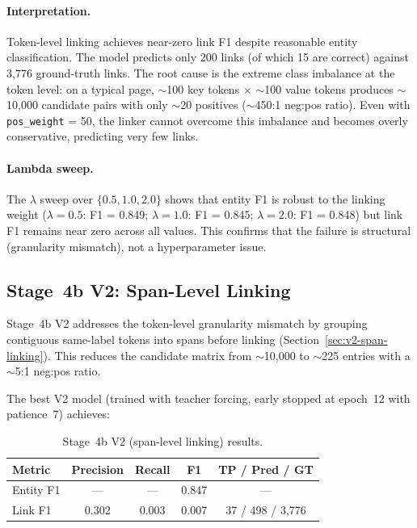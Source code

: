 \paragraph{Interpretation.}
Token-level linking achieves near-zero link F1 despite reasonable entity
classification. The model predicts only 200 links (of which 15 are correct)
against 3{,}776 ground-truth links. The root cause is the extreme class
imbalance at the token level: on a typical page, $\sim$100 key tokens
$\times$ $\sim$100 value tokens produces $\sim$10{,}000 candidate pairs with
only $\sim$20 positives ($\sim$450:1 neg:pos ratio). Even with
\texttt{pos\_weight} = 50, the linker cannot overcome this imbalance and
becomes overly conservative, predicting very few links.

\paragraph{Lambda sweep.}
The $\lambda$ sweep over $\{0.5, 1.0, 2.0\}$ shows that entity F1 is robust
to the linking weight ($\lambda = 0.5$: F1 = 0.849; $\lambda = 1.0$: F1 = 0.845;
$\lambda = 2.0$: F1 = 0.848) but link F1 remains near zero across all
values. This confirms that the failure is structural (granularity mismatch),
not a hyperparameter issue.

\subsection{Stage~4b V2: Span-Level Linking}
\label{sec:v2-results}

Stage~4b V2 addresses the token-level granularity mismatch by grouping
contiguous same-label tokens into spans before linking
(Section~\ref{sec:v2-span-linking}). This reduces the candidate matrix from
$\sim$10{,}000 to $\sim$225 entries with a $\sim$5:1 neg:pos ratio.

The best V2 model (trained with teacher forcing, early stopped at epoch~12
with patience~7) achieves:

\begin{table}[ht]
  \centering
  \caption{Stage~4b V2 (span-level linking) results.}
  \label{tab:v2-results}
  \begin{tabular}{@{}lcccc@{}}
    \toprule
    \textbf{Metric} & \textbf{Precision} & \textbf{Recall} & \textbf{F1} & \textbf{TP / Pred / GT} \\
    \midrule
    Entity F1 & --- & --- & 0.847 & --- \\
    Link F1   & 0.302 & 0.003 & 0.007 & 37 / 498 / 3{,}776 \\
    \bottomrule
  \end{tabular}
\end{table}

